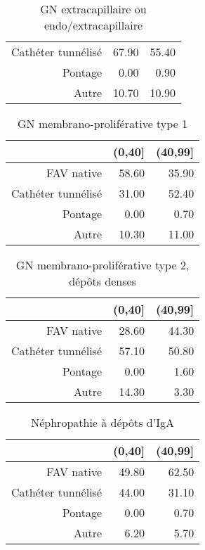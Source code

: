\documentclass[11pt,a4paper]{article}\usepackage[]{graphicx}\usepackage[]{color}
\begin{document}
\begin{multicols}{2}
\begin{table}[H]
\begin{tabular}{rrr}
  Cathéter tunnélisé & 67.90 & 55.40 \\ 
  Pontage & 0.00 & 0.90 \\ 
  Autre & 10.70 & 10.90 \\ 
   \hline
\end{tabular}
\caption{GN extracapillaire ou endo/extracapillaire} 
\end{table}
\begin{table}[H]
\centering
\begin{tabular}{rrr}
  \hline
 & (0,40] & (40,99] \\ 
  \hline
FAV native & 58.60 & 35.90 \\ 
  Cathéter tunnélisé & 31.00 & 52.40 \\ 
  Pontage & 0.00 & 0.70 \\ 
  Autre & 10.30 & 11.00 \\ 
   \hline
\end{tabular}
\caption{GN membrano-proliférative type 1} 
\end{table}
\begin{table}[H]
\centering
\begin{tabular}{rrr}
  \hline
 & (0,40] & (40,99] \\ 
  \hline
FAV native & 28.60 & 44.30 \\ 
  Cathéter tunnélisé & 57.10 & 50.80 \\ 
  Pontage & 0.00 & 1.60 \\ 
  Autre & 14.30 & 3.30 \\ 
   \hline
\end{tabular}
\caption{GN membrano-proliférative type 2, dépôts denses} 
\end{table}
\begin{table}[H]
\centering
\begin{tabular}{rrr}
  \hline
 & (0,40] & (40,99] \\ 
  \hline
FAV native & 49.80 & 62.50 \\ 
  Cathéter tunnélisé & 44.00 & 31.10 \\ 
  Pontage & 0.00 & 0.70 \\ 
  Autre & 6.20 & 5.70 \\ 
   \hline
\end{tabular}
\caption{Néphropathie à dépôts d'IgA} 
\end{table}

\end{multicols}
\end{document}
